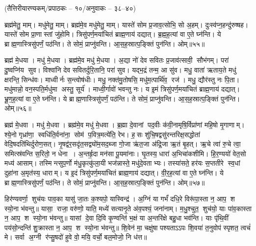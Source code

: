 \vspace{-1ex}
\centerline{\normalsize (तैत्तिरीयारण्यकम्/प्रपाठकः – १०/अनुवाकः – ३८–४०)}
ब्रह्म॑मेतु॒ माम्। मधु॑मेतु॒ माम्। ब्रह्म॑मे॒व मधु॑मेतु॒ माम्। यास्ते॑ सोम प्र॒जाव॒त्सोभि॒ सो अ॒हम्। दुःस्व॑प्न॒हन्दु॑रुष्षह। यास्ते॑ सोम प्रा॒णास्तां जु॑होमि। त्रिसु॑पर्ण॒मया॑चितं ब्राह्म॒णाय॑ दद्यात्। ब्र॒ह्म॒ह॒त्यां वा ए॒ते घ्न॑न्ति। ये ब्राह्म॒णास्त्रिसु॑पर्णं॒ पठ॑न्ति। ते सोमं॒ प्राप्नु॑वन्ति। आ॒स॒ह॒स्रात्प॒ङ्क्तिं पुन॑न्ति। ओम्॥५५॥

ब्रह्म॑ मे॒धया। मधु॑ मे॒धया। ब्रह्म॑मे॒व मधु॑ मे॒धया। अ॒द्या नो॑ देव सवितः प्र॒जाव॑त्सावी॒ सौभ॑गम्। परा॑ दु॒ष्वप्नि॑य सुव। विश्वा॑नि देव सवितर्दुरि॒तानि॒ परा॑ सुव। यद्भ॒द्रं तन्म॒ आ सु॑व। मधु॒ वाता॑ ऋताय॒ते मधु॑ क्षरन्ति॒ सिन्ध॑वः। माध्वीर्नः स॒न्त्वोष॑धीः। मधु॒ नक्त॑मु॒तोषसि॒ मधु॑म॒त्पार्थि॑व॒ रज॑। मधु॒ द्यौर॑स्तु नः पि॒ता। मधु॑मान्नो॒ वन॒स्पति॒र्मधु॑मा अस्तु॒ सूर्य॑। माध्वी॒र्गावो॑ भवन्तु नः। य इ॒मं त्रिसु॑पर्ण॒मया॑चितं ब्राह्म॒णाय॑ दद्यात्। भ्रू॒ण॒ह॒त्यां वा ए॒ते घ्न॑न्ति। ये ब्राह्म॒णास्त्रिसु॑पर्णं॒ पठ॑न्ति। ते सोमं॒ प्राप्नु॑वन्ति। आ॒स॒ह॒स्रात्प॒ङ्क्तिं पुन॑न्ति। ओम्॥५६॥

ब्रह्म॑ मे॒धवा। मधु॑ मे॒धवा। ब्रह्म॑मे॒व मधु॑ मे॒धवा। ब्र॒ह्मा दे॒वानां पद॒वीः क॑वी॒नामृषि॒र्विप्रा॑णां महि॒षो मृ॒गाणाम्। श्ये॒नो गृध्रा॑णा॒ स्वधि॑ति॒र्वना॑ना॒ सोम॑ प॒वित्र॒मत्ये॑ति॒ रेभ\sn{}। ह॒सः शु॑चि॒षद्वसु॑रन्तरिक्ष॒सद्धोता॑ वेदि॒षदति॑थिर्दुरोण॒सत्। नृ॒षद्व॑र॒सदृ॑त॒सद्व्यो॑म॒सद॒ब्जा गो॒जा ऋ॑त॒जा अ॑द्रि॒जा ऋ॒तं बृ॒हत्। ऋ॒चे त्वा॑ रु॒चे त्वा॒ समित्स्र॑वन्ति स॒रितो॒ न धेना। अ॒न्तर्\mbox{}हृ॒दा मन॑सा पू॒यमा॑नाः। घृ॒तस्य॒ धारा॑ अ॒भिचा॑कशीमि। हि॒र॒ण्ययो॑ वेत॒सो मध्य॑ आसाम्। \mbox{तस्मि\hspace{1ex}\hspace{-1ex}न्त्सु}\-प॒र्णो म॑धु॒कृत्कु॑ला॒यी भज॑न्नास्ते॒ मधु॑\-दे॒वताभ्यः। तस्या॑सते॒ हर॑यः स॒प्ततीरे स्व॒धां दुहा॑ना अ॒मृत॑स्य॒ धाराम्। य इ॒दं त्रिसु॑पर्ण॒मया॑चितं ब्राह्म॒णाय॑ दद्यात्। वी॒र॒ह॒त्यां वा ए॒ते घ्न॑न्ति। ये ब्राह्म॒णास्त्रिसु॑पर्णं॒ पठ॑न्ति। ते सोमं॒ प्राप्नु॑वन्ति। आ॒स॒ह॒स्रात्प॒ङ्क्तिं पुन॑न्ति। ओम्॥५७॥
\closesection
\clearpage

 
\closesection

हिर॑ण्यवर्णा॒ शुच॑यः पाव॒का यासु॑ जा॒तः क॒श्यपो॒ यास्विन्द्र॑।
अ॒ग्निं या गर्भं॑ दधि॒रे विरू॑पा॒स्ता न॒ आप॒ श स्यो॒ना भ॑वन्तु॥ 
यासा॒ राजा॒ वरु॑णो॒ याति॒ मध्ये॑ सत्यानृ॒ते अ॑व॒पश्यं॒ जना॑नाम्।
म॒धु॒श्चुत॒ शुच॑यो॒ याः पा॑व॒कास्ता न॒ आप॒ श स्यो॒ना भ॑वन्तु॥ 
यासां दे॒वा दि॒वि कृ॒ण्वन्ति॑ भ॒क्षं या अ॒न्तरि॑क्षे बहु॒धा भव॑न्ति।
याः पृ॑थि॒वीं पय॑सो॒न्दन्ति॑ शु॒क्रास्ता न॒ आप॒ श स्यो॒ना भ॑वन्तु॥ 
शि॒वेन॑ मा॒ चक्षु॑षा पश्यताऽऽपः शि॒वया॑ त॒नुवोप॑ स्पृशत॒ त्वचं॑ मे।
सर्वा अ॒ग्नी र॑प्सु॒षदो॑ हुवे वो॒ मयि॒ वर्चो॒ बल॒मोजो॒ नि ध॑त्त॥
\clearpage
 
\clearpage
 
 
\clearpage
 
\clearpage
\setmainfont[Script=Devanagari,Mapping=tex-text]{Sanskrit 2003}
